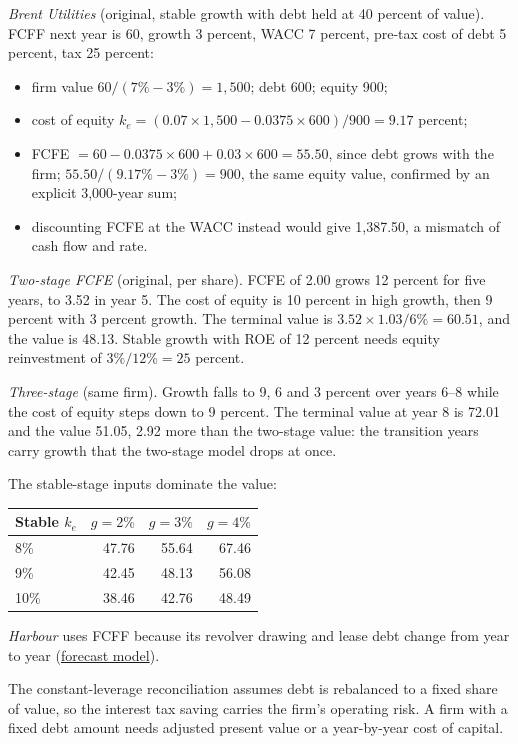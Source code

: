 \begin{qfmethod}
 \emph{Brent Utilities} (original, stable growth with debt held at 40 percent of value). FCFF next year is 60, growth 3 percent, WACC 7 percent, pre-tax cost of debt 5 percent, tax 25 percent:
\begin{itemize}
\item firm value $60/(7\%-3\%)=1{,}500$; debt 600; equity 900;
\item cost of equity $k_e=(0.07\times1{,}500-0.0375\times600)/900=9.17$ percent;
\item FCFE $=60-0.0375\times600+0.03\times600=55.50$, since debt grows with the firm; $55.50/(9.17\%-3\%)=900$, the same equity value, confirmed by an explicit 3,000-year sum;
\item discounting FCFE at the WACC instead would give 1,387.50, a mismatch of cash flow and rate.
\end{itemize}

\emph{Two-stage FCFE} (original, per share). FCFE of 2.00 grows 12 percent for five years, to 3.52 in year 5. The cost of equity is 10 percent in high growth, then 9 percent with 3 percent growth. The terminal value is $3.52\times1.03/6\%=60.51$, and the value is 48.13. Stable growth with ROE of 12 percent needs equity reinvestment of $3\%/12\%=25$ percent.

\emph{Three-stage} (same firm). Growth falls to 9, 6 and 3 percent over years 6--8 while the cost of equity steps down to 9 percent. The terminal value at year 8 is 72.01 and the value 51.05, 2.92 more than the two-stage value: the transition years carry growth that the two-stage model drops at once.

The stable-stage inputs dominate the value:
\begin{center}\small
\begin{tabular}{@{}lrrr@{}}
\toprule
Stable $k_e$ & $g=2\%$ & $g=3\%$ & $g=4\%$ \\
\midrule
8\% & 47.76 & 55.64 & 67.46 \\
9\% & 42.45 & 48.13 & 56.08 \\
10\% & 38.46 & 42.76 & 48.49 \\
\bottomrule
\end{tabular}
\end{center}

\emph{Harbour} uses FCFF because its revolver drawing and lease debt change from year to year (\hyperref[meth:forecast-model-valuation]{forecast model}).

 The constant-leverage reconciliation assumes debt is rebalanced to a fixed share of value, so the interest tax saving carries the firm's operating risk. A firm with a fixed debt amount needs adjusted present value or a year-by-year cost of capital.


\end{qfmethod}
